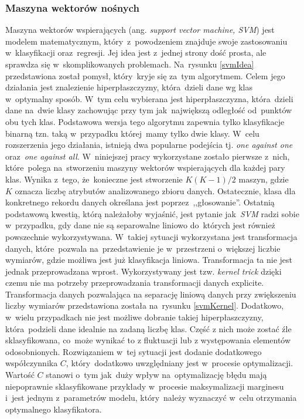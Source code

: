\subsubsection{Maszyna wektorów nośnych}
Maszyna wektorów wspierających (ang. \textit{support vector machine, SVM}) jest modelem matematycznym, który~z~powodzeniem znajduje swoje zastosowaniu w~klasyfikacji oraz~regresji. Jej idea jest z~jednej strony dość prosta, ale sprawdza się w~skomplikowanych problemach\cite{svm1}. Na~rysunku \ref{svmIdea} przedstawiona został pomysł, który~kryje się za~tym algorytmem. Celem jego działania jest znalezienie hiperpłaszczyzny, która~dzieli dane wg klas w~optymalny sposób. W~tym celu wybierana jest hiperpłaszczyzna, która~dzieli dane na~dwie klasy zachowując przy tym jak~największą odległość od~punktów obu tych klas\cite{svm2}. Podstawowa wersja tego algorytmu zapewnia tylko klasyfikacje binarną tzn. taką w~przypadku której~mamy tylko dwie klasy. W~celu rozszerzenia jego działania, istnieją dwa popularne podejścia  tj. \textit{one against one} oraz~\textit{one against all}\cite{svm3}. W~niniejszej pracy wykorzystane zostało pierwsze z~nich, które~polega na~stworzeniu maszyny wektorów wspierających dla każdej pary klas. Wynika z~tego, że~konieczne jest stworzenie $K(K-1)/2$ maszyn, gdzie ~$K$ oznacza liczbę atrybutów analizowanego zbioru danych. Ostatecznie, klasa dla konkretnego rekordu danych określana jest poprzez~,,głosowanie''. Ostatnią podstawową kwestią, którą należałoby wyjaśnić, jest pytanie jak~\textit{SVM} radzi sobie w~przypadku, gdy dane nie są separowalne liniowo do~których jest również powszechnie wykorzystywana. W~takiej sytuacji wykorzystana jest transformacja danych, które~pozwala na~przedstawienie je w~przestrzeni o~większej liczbie wymiarów, gdzie możliwa jest już klasyfikacja liniowa. Transformacja ta nie jest jednak przeprowadzana wprost. Wykorzystywany jest tzw. \textit{kernel trick} dzięki czemu nie ma potrzeby przeprowadzania transformacji danych explicite. Transformacja danych pozwalająca na separację liniową danych przy zwiększeniu liczby wymiarów przedstawiona została na~rysunku \ref{svmKernel}. Dodatkowo, w~wielu przypadkach nie jest możliwe dobranie takiej hiperpłaszczyzny, która~podzieli dane idealnie na zadaną liczbę klas. Część z nich może zostać źle sklasyfikowana, co~może wynikać to z fluktuacji lub z występowania elementów odosobnionych. Rozwiązaniem w~tej sytuacji jest dodanie dodatkowego współczynnika $C$, który~dodatkowo uwzględniany jest w~procesie optymalizacji. Wartość $C$ stanowi o~tym jak~duży wpływ na~optymalizację błędu mają niepoprawnie sklasyfikowane przykłady w~procesie maksymalizacji marginesu i~jest jednym z~parametrów modelu, który~należy wyznaczyć w~celu otrzymania optymalnego klasyfikatora. 

